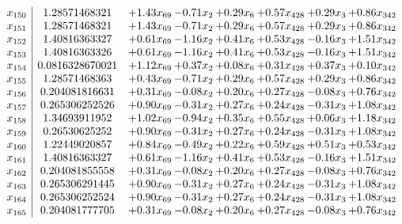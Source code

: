 \documentclass[8pt]{article}
\begin{document}
\[\begin{array}{c| c c@{\hskip 2pt} c@{\hskip 2pt} c@{\hskip 2pt} c@{\hskip 2pt} c@{\hskip 2pt} c@{\hskip 2pt} }
 x_{150}   &  1.28571468321 & +  1.43 x_{69} & -0.71 x_{2} & +  0.29 x_{6} & +  0.57 x_{428} & +  0.29 x_{3} & +  0.86 x_{342}\\
 x_{151}   &  1.28571468321 & +  1.43 x_{69} & -0.71 x_{2} & +  0.29 x_{6} & +  0.57 x_{428} & +  0.29 x_{3} & +  0.86 x_{342}\\
 x_{152}   &  1.40816363327 & +  0.61 x_{69} & -1.16 x_{2} & +  0.41 x_{6} & +  0.53 x_{428} & -0.16 x_{3} & +  1.51 x_{342}\\
 x_{153}   &  1.40816363326 & +  0.61 x_{69} & -1.16 x_{2} & +  0.41 x_{6} & +  0.53 x_{428} & -0.16 x_{3} & +  1.51 x_{342}\\
 x_{154}   &  0.0816328670021 & +  1.12 x_{69} & +  0.37 x_{2} & +  0.08 x_{6} & +  0.31 x_{428} & +  0.37 x_{3} & +  0.10 x_{342}\\
 x_{155}   &  1.28571468363 & +  0.43 x_{69} & -0.71 x_{2} & +  0.29 x_{6} & +  0.57 x_{428} & +  0.29 x_{3} & +  0.86 x_{342}\\
 x_{156}   &  0.204081816631 & +  0.31 x_{69} & -0.08 x_{2} & +  0.20 x_{6} & +  0.27 x_{428} & -0.08 x_{3} & +  0.76 x_{342}\\
 x_{157}   &  0.265306252526 & +  0.90 x_{69} & -0.31 x_{2} & +  0.27 x_{6} & +  0.24 x_{428} & -0.31 x_{3} & +  1.08 x_{342}\\
 x_{158}   &  1.34693911952 & +  1.02 x_{69} & -0.94 x_{2} & +  0.35 x_{6} & +  0.55 x_{428} & +  0.06 x_{3} & +  1.18 x_{342}\\
 x_{159}   &  0.26530625252 & +  0.90 x_{69} & -0.31 x_{2} & +  0.27 x_{6} & +  0.24 x_{428} & -0.31 x_{3} & +  1.08 x_{342}\\
 x_{160}   &  1.22449020857 & +  0.84 x_{69} & -0.49 x_{2} & +  0.22 x_{6} & +  0.59 x_{428} & +  0.51 x_{3} & +  0.53 x_{342}\\
 x_{161}   &  1.40816363327 & +  0.61 x_{69} & -1.16 x_{2} & +  0.41 x_{6} & +  0.53 x_{428} & -0.16 x_{3} & +  1.51 x_{342}\\
 x_{162}   &  0.204081855558 & +  0.31 x_{69} & -0.08 x_{2} & +  0.20 x_{6} & +  0.27 x_{428} & -0.08 x_{3} & +  0.76 x_{342}\\
 x_{163}   &  0.265306291445 & +  0.90 x_{69} & -0.31 x_{2} & +  0.27 x_{6} & +  0.24 x_{428} & -0.31 x_{3} & +  1.08 x_{342}\\
 x_{164}   &  0.265306252524 & +  0.90 x_{69} & -0.31 x_{2} & +  0.27 x_{6} & +  0.24 x_{428} & -0.31 x_{3} & +  1.08 x_{342}\\
 x_{165}   &  0.204081777705 & +  0.31 x_{69} & -0.08 x_{2} & +  0.20 x_{6} & +  0.27 x_{428} & -0.08 x_{3} & +  0.76 x_{342}\\

\end{array}\]
\end{document}
